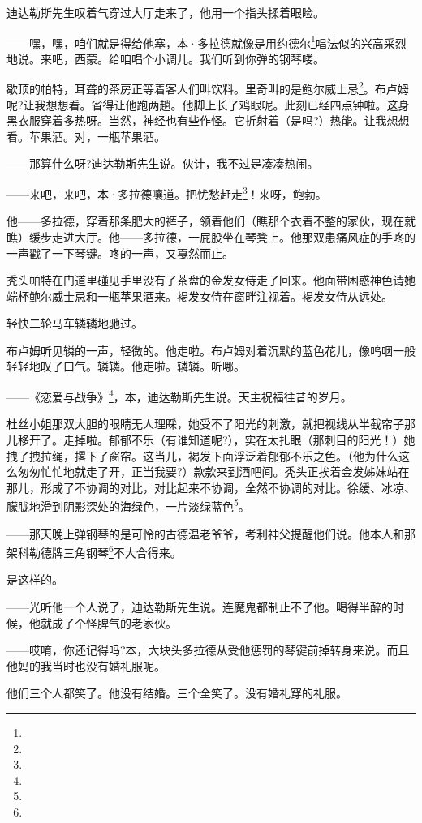 \par 迪达勒斯先生叹着气穿过大厅走来了，他用一个指头揉着眼睑。
\par ——嘿，嘿，咱们就是得给他塞，本·多拉德就像是用约德尔\footnote{}唱法似的兴高采烈地说。来吧，西蒙。给咱唱个小调儿。我们听到你弹的钢琴喽。
\par 歇顶的帕特，耳聋的茶房正等着客人们叫饮料。里奇叫的是鲍尔威士忌\footnote{}。布卢姆呢?让我想想看。省得让他跑两趟。他脚上长了鸡眼呢。此刻已经四点钟啦。这身黑衣服穿着多热呀。当然，神经也有些作怪。它折射着（是吗?）热能。让我想想看。苹果酒。对，一瓶苹果酒。
\par ——那算什么呀?迪达勒斯先生说。伙计，我不过是凑凑热闹。
\par ——来吧，来吧，本·多拉德嚷道。把忧愁赶走\footnote{}！来呀，鲍勃。
\par 他——多拉德，穿着那条肥大的裤子，领着他们（瞧那个衣着不整的家伙，现在就瞧）缓步走进大厅。他——多拉德，一屁股坐在琴凳上。他那双患痛风症的手咚的一声戳了一下琴键。咚的一声，又戛然而止。
\par 秃头帕特在门道里碰见手里没有了茶盘的金发女侍走了回来。他面带困惑神色请她端杯鲍尔威士忌和一瓶苹果酒来。褐发女侍在窗畔注视着。褐发女侍从远处。
\par 轻快二轮马车辚辚地驰过。
\par 布卢姆听见辚的一声，轻微的。他走啦。布卢姆对着沉默的蓝色花儿，像呜咽一般轻轻地叹了口气。辚辚。他走啦。辚辚。听哪。
\par ——《恋爱与战争》\footnote{}，本，迪达勒斯先生说。天主祝福往昔的岁月。
\par 杜丝小姐那双大胆的眼睛无人理睬，她受不了阳光的刺激，就把视线从半截帘子那儿移开了。走掉啦。郁郁不乐（有谁知道呢?），实在太扎眼（那刺目的阳光！）她拽了拽拉绳，撂下了窗帘。这当儿，褐发下面浮泛着郁郁不乐之色。（他为什么这么匆匆忙忙地就走了开，正当我要?）款款来到酒吧间。秃头正挨着金发姊妹站在那儿，形成了不协调的对比，对比起来不协调，全然不协调的对比。徐缓、冰凉、朦胧地滑到阴影深处的海绿色，一片淡绿蓝色\footnote{}。
\par ——那天晚上弹钢琴的是可怜的古德温老爷爷，考利神父提醒他们说。他本人和那架科勒德牌三角钢琴\footnote{}不大合得来。
\par 是这样的。
\par ——光听他一个人说了，迪达勒斯先生说。连魔鬼都制止不了他。喝得半醉的时候，他就成了个怪脾气的老家伙。
\par ——哎唷，你还记得吗?本，大块头多拉德从受他惩罚的琴键前掉转身来说。而且他妈的我当时也没有婚礼服呢。
\par 他们三个人都笑了。他没有结婚。三个全笑了。没有婚礼穿的礼服。
